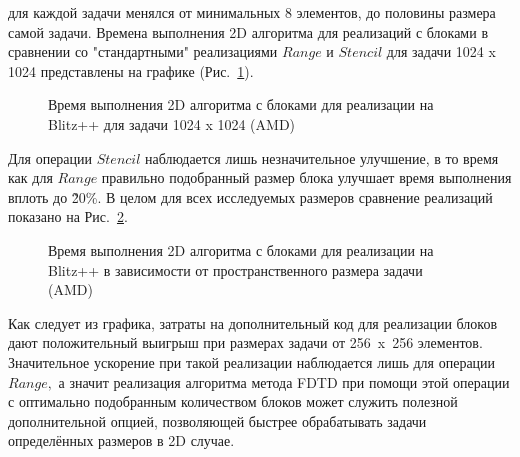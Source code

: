 \documentclass[10pt]{article}
\begin{document}
для каждой задачи менялся от минимальных 8 элементов, до половины размера самой 
задачи. Времена выполнения 2D алгоритма для реализаций с блоками в сравнении со 
"стандартными" реализациями $Range$ и 
$Stencil$ для задачи 1024 x 1024 представлены на графике (Рис.~\ref{task}).
\begin{figure}[h]
\begin{minipage}[h]{1\textwidth}
\end{minipage}
\caption{Время выполнения 2D алгоритма с блоками для реализации на Blitz++ 
  для задачи 1024 x 1024 (AMD)}
\label{task}
\end{figure}
\clearpage
Для операции $Stencil$ 
наблюдается лишь незначительное улучшение, в то время как для $Range$ правильно
подобранный размер блока улучшает время выполнения вплоть до \~20\%. В целом 
для всех исследуемых размеров сравнение реализаций показано на 
Рис.~\ref{2D_blocks}.\\
\begin{figure}[h]
\begin{minipage}[h]{1\textwidth}
\end{minipage}
\caption{Время выполнения 2D алгоритма с блоками для реализации на Blitz++
  в зависимости от пространственного размера задачи (AMD)}
\label{2D_blocks}
\end{figure}
Как следует из графика, затраты на дополнительный код для реализации блоков дают
положительный выигрыш при размерах задачи от 256~x~256 элементов. Значительное
ускорение при такой реализации наблюдается лишь для операции $Range,$ а значит
реализация алгоритма метода FDTD при помощи этой операции с оптимально 
подобранным количеством блоков может служить полезной дополнительной опцией,
позволяющей быстрее обрабатывать задачи определённых размеров в 2D случае.
\end{document}
